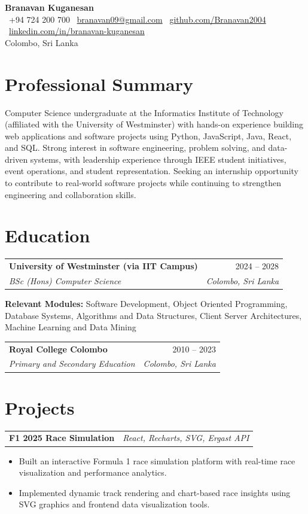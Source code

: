 \documentclass[letterpaper,10pt]{article}
\makeatletter
\newcommand{\resumeSubheading}[4]{
  \begin{tabular*}{\textwidth}{l@{\extracolsep{\fill}}r}
    \textbf{#1} & #2 \\
    \textit{#3} & \textit{#4} \\
  \end{tabular*}\vspace{-4pt}
}
\newcommand{\resumeProjectHeading}[2]{
  \begin{tabular*}{\textwidth}{l@{\extracolsep{\fill}}r}
    \textbf{#1} & \textit{#2} \\
  \end{tabular*}\vspace{-4pt}
}
\makeatother
\begin{document}
\begin{center}
  {\Huge \textbf{Branavan Kuganesan}} \\[6pt]
  \faPhone\ +94 724 200 700 \quad
  \faEnvelope\ \href{mailto:branavan09@gmail.com}{branavan09@gmail.com} \quad
  \faGithub\ \href{https://github.com/Branavan2004}{github.com/Branavan2004} \quad
  \faLinkedin\ \href{https://linkedin.com/in/branavan-kuganesan}{linkedin.com/in/branavan-kuganesan} \\[4pt]
  Colombo, Sri Lanka
\end{center}

\section{Professional Summary}
Computer Science undergraduate at the Informatics Institute of Technology (affiliated with the University of Westminster) with hands-on experience building web applications and software projects using Python, JavaScript, Java, React, and SQL. Strong interest in software engineering, problem solving, and data-driven systems, with leadership experience through IEEE student initiatives, event operations, and student representation. Seeking an internship opportunity to contribute to real-world software projects while continuing to strengthen engineering and collaboration skills.

\section{Education}
\resumeSubheading
  {University of Westminster (via IIT Campus)}{2024 -- 2028}
  {BSc (Hons) Computer Science}{Colombo, Sri Lanka}
\textbf{Relevant Modules:} Software Development, Object Oriented Programming, Database Systems, Algorithms and Data Structures, Client Server Architectures, Machine Learning and Data Mining

\vspace{4pt}
\resumeSubheading
  {Royal College Colombo}{2010 -- 2023}
  {Primary and Secondary Education}{Colombo, Sri Lanka}

\section{Projects}
\resumeProjectHeading{F1 2025 Race Simulation}{React, Recharts, SVG, Ergast API}
\begin{itemize}
  \item Built an interactive Formula 1 race simulation platform with real-time race visualization and performance analytics.
  \item Implemented dynamic track rendering and chart-based race insights using SVG graphics and frontend data visualization tools.
\end{itemize}
\end{document}
